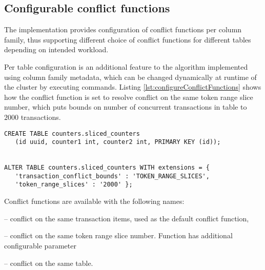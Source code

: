 

\subsection{Configurable conflict functions}
The implementation provides configuration of conflict functions per column family, thus supporting different choice of conflict functions for different tables depending on intended workload.

Per table configuration is an additional feature to the algorithm implemented using column family metadata, which can be changed dynamically at runtime of the cluster by executing  commands. Listing \ref{lst:configureConflictFunctions} shows how the conflict function is set to resolve conflict on the same token range slice number, which puts bounds on number of concurrent transactions in table  to $2000$ transactions. 

\begin{lstlisting}[style=outcode,label={lst:configureConflictFunctions},caption={Configuring conflict function on Cassandra table}]
CREATE TABLE counters.sliced_counters 
   (id uuid, counter1 int, counter2 int, PRIMARY KEY (id));


ALTER TABLE counters.sliced_counters WITH extensions = { 
   'transaction_conflict_bounds' : 'TOKEN_RANGE_SLICES', 
   'token_range_slices' : '2000' };
\end{lstlisting}

Conflict functions are available with the following names:
\begin{enumerate*}
\item {} -- conflict on the same transaction items, used as the default conflict function,
\item {} -- conflict on the same token range slice number. Function has additional configurable parameter 
\item {} -- conflict on the same table.
\end{enumerate*}
